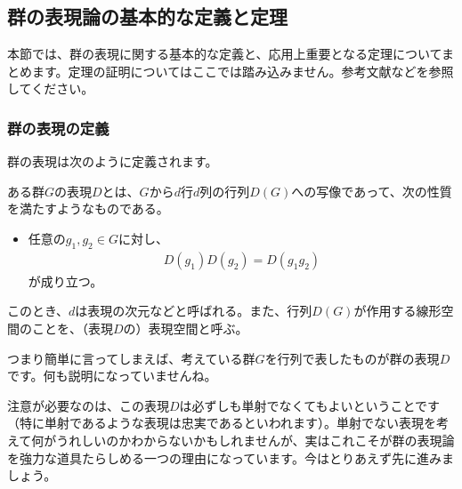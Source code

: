 \documentclass[uplatex,dvipdfmx,a4j]{jsarticle}
\begin{document}



\subsection{群の表現論の基本的な定義と定理}
本節では、群の表現に関する基本的な定義と、応用上重要となる定理についてまとめます。定理の証明についてはここでは踏み込みません。参考文献などを参照してください。

\subsubsection{群の表現の定義}
群の表現は次のように定義されます。
\begin{tcolorbox}[title=定義：群の表現]
	ある群$G$の表現$D$とは、$G$から$d$行$d$列の行列$D(G)$への写像であって、次の性質を満たすようなものである。
	\begin{itemize}
		\item 任意の$g_1, g_2 \in G$に対し、\begin{align}
			D(g_1)D(g_2) = D(g_1 g_2) \label{eq:def_expression}
		\end{align}が成り立つ。
	\end{itemize}
	このとき、$d$は表現の次元などと呼ばれる。また、行列$D(G)$が作用する線形空間のことを、（表現$D$の）表現空間と呼ぶ。
\end{tcolorbox}

つまり簡単に言ってしまえば、考えている群$G$を行列で表したものが群の表現$D$です。何も説明になっていませんね。

注意が必要なのは、この表現$D$は必ずしも単射でなくてもよいということです（特に単射であるような表現は忠実であるといわれます）。単射でない表現を考えて何がうれしいのかわからないかもしれませんが、実はこれこそが群の表現論を強力な道具たらしめる一つの理由になっています。今はとりあえず先に進みましょう。
\end{document}
